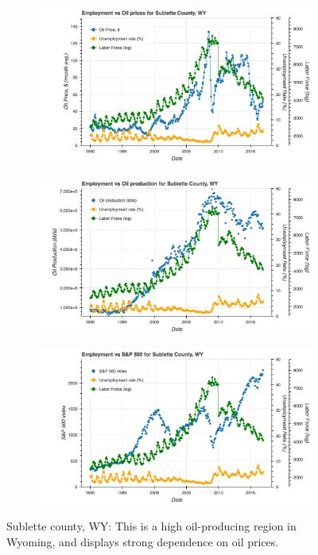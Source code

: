 \documentclass[11pt,letterpaper]{article}
\begin{document}
\begin{figure}
\centering
\begin{subfigure}{0.6\textwidth}
\includegraphics[width=\linewidth]{wy_sublette_oil_price}
\end{subfigure}

\begin{subfigure}{0.6\textwidth}
\includegraphics[width=\linewidth]{wy_sublette_oil_prod}
\end{subfigure}

\begin{subfigure}{0.6\textwidth}
\includegraphics[width=\linewidth]{wy_sublette_snp}
\end{subfigure}
\caption{Sublette county, WY: This is a high oil-producing region in Wyoming, and displays strong dependence on oil prices.}
\label{fig:wy_sublette}
\end{figure}
\end{document}
